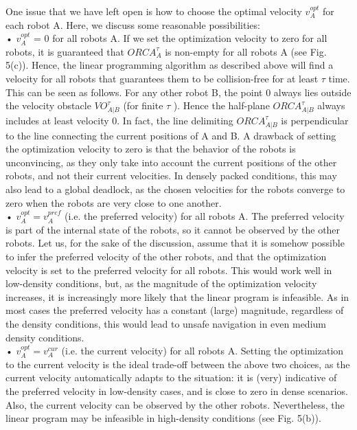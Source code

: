 \documentclass[12pt]{report}
\begin{document}
One issue that we have left open is how to choose the optimal velocity $v^{opt}_{A}$ for each robot A. Here, we discuss some reasonable possibilities:\\
• $v^{opt}_{A}$ = 0 for all robots A. If we set the optimization velocity to zero for all robots, it is guaranteed that $ORCA^{\tau}_{A}$ is non-empty for all robots A (see Fig. 5(c)). Hence, the linear programming algorithm as described above will find a velocity for all robots that guarantees them to be collision-free for at least $\tau$ time. This can be seen as follows. For any other robot B, the point 0 always lies outside the velocity obstacle $VO^{\tau}_{A|B}$ (for finite $\tau$ ). Hence the half-plane $ORCA^{\tau}_{A|B}$ always includes at least velocity 0. In fact, the line delimiting $ORCA^{\tau}_{A|B}$ is perpendicular to the line connecting the current positions of A and B. A drawback of setting the optimization velocity to zero is that the behavior of
the robots is unconvincing, as they only take into account the current positions of
the other robots, and not their current velocities. In densely packed conditions,
this may also lead to a global deadlock, as the chosen velocities for the robots
converge to zero when the robots are very close to one another.\\
• $v^{opt}_{A} = v^{pref}_{A}$ (i.e. the preferred velocity) for all robots A. The preferred velocity is part of the internal state of the robots, so it cannot be observed by the other robots. Let us, for the sake of the discussion, assume that it is somehow possible to infer the preferred velocity of the other robots, and that the optimization
velocity is set to the preferred velocity for all robots. This would work well in low-density conditions, but, as the magnitude of the optimization velocity increases, it is increasingly more likely that the linear program is infeasible. As in most cases the preferred velocity has a constant (large) magnitude, regardless of the density conditions, this would lead to unsafe navigation in even medium density conditions.\\
• $v^{opt}_{A} = v^{cur}_{A}$ (i.e. the current velocity) for all robots A. Setting the optimization to the current velocity is the ideal trade-off between the above two choices, as the current velocity automatically adapts to the situation: it is (very) indicative of the preferred velocity in low-density cases, and is close to zero in dense scenarios. Also, the current velocity can be observed by the other robots. Nevertheless,
the linear program may be infeasible in high-density conditions (see Fig. 5(b)).\\
\end{document}
